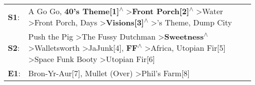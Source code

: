 \begin{supertabular}{p{0.03\textwidth}p{0.92\textwidth}}
 \textbf{S1}:  &                                                                A Go Go\textsuperscript{}, \enspace \textbf{40's Theme[1]\textsuperscript{$\wedge$}} \textgreater \enspace \textbf{Front Porch[2]\textsuperscript{$\wedge$}} \textgreater \enspace Water\textsuperscript{} \textgreater \enspace Front Porch\textsuperscript{},  Days\textsuperscript{} \textgreater \enspace \textbf{Visions[3]\textsuperscript{$\wedge$}} \textgreater {}'s Theme\textsuperscript{}, \enspace Dump City\textsuperscript{}  \enspace  \\
 \textbf{S2}:  &  Push the Pig\textsuperscript{} \textgreater \enspace The Fussy Dutchman\textsuperscript{} \textgreater \enspace \textbf{Sweetness\textsuperscript{$\wedge$}} \textgreater \enspace Walletsworth\textsuperscript{} \textgreater \enspace JaJunk[4]\textsuperscript{}, \enspace \textbf{FF\textsuperscript{$\wedge$}} \textgreater \enspace Africa\textsuperscript{}, \enspace Utopian Fir[5]\textsuperscript{} \textgreater \enspace Space Funk Booty\textsuperscript{} \textgreater \enspace Utopian Fir[6]\textsuperscript{}  \enspace  \\
 \textbf{E1}:  &                                                                                                                                                                                                                                                                                                                                                                                              Bron-Yr-Aur[7]\textsuperscript{}, \enspace Mullet (Over)\textsuperscript{} \textgreater \enspace Phil's Farm[8]\textsuperscript{}  \enspace  \\
\end{supertabular}
